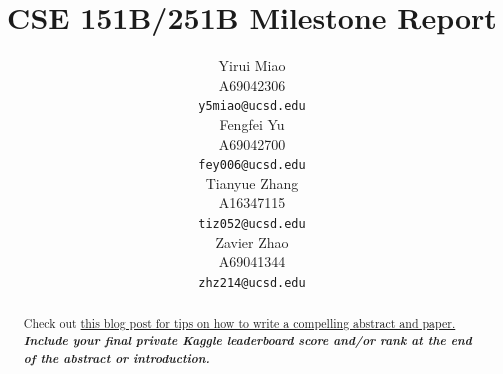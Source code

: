 \documentclass{article}
\title{
CSE 151B/251B Milestone Report
\\
}
\author{%
    Yirui Miao \\
    A69042306 \\
    \texttt{y5miao@ucsd.edu} \\
    \And
    Fengfei Yu \\
    A69042700 \\
    \texttt{fey006@ucsd.edu} \\
    \And
    Tianyue Zhang \\
    A16347115 \\
    \texttt{tiz052@ucsd.edu} \\
    \And
    Zavier Zhao \\
    A69041344 \\
    \texttt{zhz214@ucsd.edu} \\
}
\begin{document}
\maketitle


\begin{abstract}
Check out \href{https://www.alignmentforum.org/posts/eJGptPbbFPZGLpjsp/highly-opinionated-advice-on-how-to-write-ml-papers#Abstract}{this blog post for tips on how to write a compelling abstract and paper.} \textbf{\textit{Include your final private Kaggle leaderboard score and/or rank at the end of the abstract or introduction.}}
\end{abstract}



\end{document}
